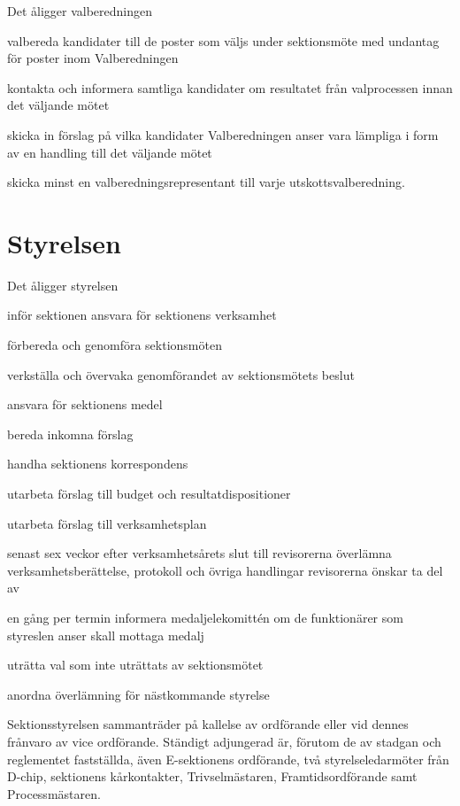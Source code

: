 \documentclass[pdfbookmarks,a4paper,11pt]{article}
\newlength{\itemcollength}
\newenvironment{reglemlista}{%
  \begin{list}{}{%
      \setlength{\labelwidth}{\itemcollength}%
      \setlength{\leftmargin}{\labelwidth + \labelsep}%
      \renewcommand{\makelabel}[1]{%
        \raisebox{0pt}[1ex][0pt]{%
          \makebox[\labelwidth][l]{%
            \parbox[t]{\itemcollength}{%
              \raggedright\hspace{0pt}##1}}}\hfill}%
      }}{%
  \end{list}}
\begin{document}
\begin{reglemlista}

	\item[Åligganden]
	Det åligger valberedningen
	\begin{attlista}
		\item valbereda kandidater till de poster som väljs under sektionsmöte med undantag för poster inom Valberedningen
		\item kontakta och informera samtliga kandidater om resultatet från valprocessen innan det
		väljande mötet
		\item skicka in förslag på vilka kandidater Valberedningen anser vara lämpliga i form av en
		handling till det väljande mötet
	\item skicka minst en valberedningsrepresentant till varje utskottsvalberedning.
	\end{attlista}
\end{reglemlista}

\section{Styrelsen}

\begin{reglemlista}

	\item[Åligganden]
	Det åligger styrelsen
	\begin{attlista}
		\item inför sektionen ansvara för sektionens verksamhet
		\item förbereda och genomföra sektionsmöten
		\item verkställa och övervaka genomförandet av sektionsmötets beslut
		\item ansvara för sektionens medel
		\item bereda inkomna förslag
		\item handha sektionens korrespondens
		\item utarbeta förslag till budget och resultatdispositioner
		\item utarbeta förslag till verksamhetsplan
		\item senast sex veckor efter verksamhetsårets slut till revisor\-erna överlämna verksamhetsberättelse, protokoll och övriga handlingar revisorerna önskar ta del av
		\item en gång per termin informera medaljelekomittén om de funktionärer som styreslen anser skall mottaga medalj
		\item uträtta val som inte uträttats av sektionsmötet
		\item anordna överlämning för nästkommande styrelse
	\end{attlista}

	\item[Sammanträde]
	Sektionsstyrelsen sammanträder på kallelse av ordförande eller vid dennes frånvaro av vice ordförande. Ständigt adjungerad är, förutom de av stadgan och reglementet fastställda, även E-sektionens
	ordförande, två styrelseledarmöter från D-chip, sektionens kårkontakter, Trivselmästaren, Framtidsordförande samt Processmästaren.

\end{reglemlista}
\end{document}
